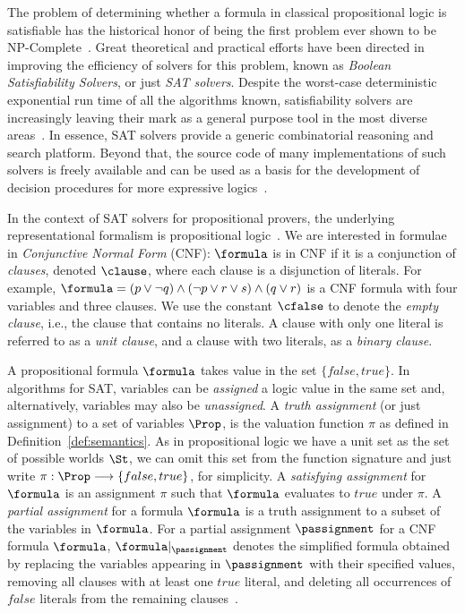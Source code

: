 The problem of determining whether a formula in classical propositional logic is
satisfiable has the historical honor of being the first problem ever shown to be
NP-Complete~\cite{Cook}. Great theoretical and practical efforts have been
directed in improving the efficiency of solvers for this problem, known as
\emph{Boolean Satisfiability Solvers}, or just \emph{SAT solvers}. Despite the
worst-case deterministic exponential run time of all the algorithms known,
satisfiability solvers are increasingly leaving their mark as a general purpose
tool in the most diverse areas~\cite{satchapter}. In essence, SAT solvers
provide a generic combinatorial reasoning and search platform. Beyond that, the
source code of many implementations of such solvers is freely available and can
be used as a basis for the development of decision procedures for more
expressive logics~\cite{giunchiglia2002sat}.

In the context of SAT solvers for propositional provers, the underlying
representational formalism is propositional logic~\cite{satchapter}. We are
interested in formulae in \emph{Conjunctive Normal Form} (CNF): $\formula$ is in
CNF if it is a conjunction of \emph{clauses}, denoted $\clause$, where each
clause is a disjunction of literals. For example, $\formula = (p \lor \neg q)
\land (\neg p \lor r \lor s) \land (q \lor r)$ is a CNF formula with four
variables and three clauses.  We use the constant $\cfalse$ to denote the
\emph{empty clause}, i.e., the clause that contains no literals. A clause with
only one literal is referred to as a \emph{unit clause}, and a clause with two
literals, as a \emph{binary clause}.

A propositional formula $\formula$ takes value in the set $\{false, true\}$. In
algorithms for SAT, variables can be \emph{assigned} a logic value in the same
set and, alternatively, variables may also be \emph{unassigned}. A \emph{truth
assignment} (or just assignment) to a set of variables $\Prop$, is the valuation
function $\pi$ as defined in Definition~\ref{def:semantics}. As in propositional
logic we have a unit set as the set of possible worlds $\St$, we can omit this
set from the function signature and just write $\pi : \Prop \longrightarrow
\{false,true\}$, for simplicity. A \emph{satisfying assignment} for $\formula$
is an assignment $\pi$ such that $\formula$ evaluates to $true$ under $\pi$.  A
\emph{partial assignment} for a formula $\formula$ is a truth assignment to a
subset of the variables in $\formula$. For a partial assignment $\passignment$
for a CNF formula $\formula$, $\formula|_\passignment$ denotes the simplified
formula obtained by replacing the variables appearing in $\passignment$ with
their specified values, removing all clauses with at least one $true$ literal,
and deleting all occurrences of $false$ literals from the remaining
clauses~\cite{satchapter}.   

